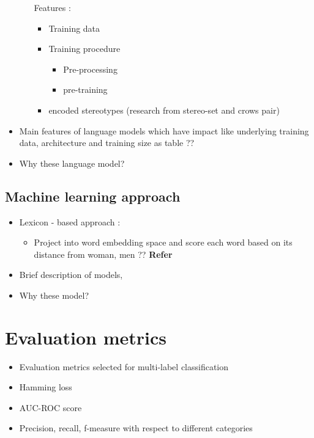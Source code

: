 \begin{itemize}
\begin{itemize}
            Features :
            \begin{itemize}
                \item Training data 
                \item Training procedure
                \begin{itemize}
                    \item Pre-processing
                    \item pre-training
                \end{itemize}
                \item encoded stereotypes (research from stereo-set and crows pair)
            \end{itemize}
    \end{itemize}
    \item Main features of language models which have impact like underlying training data, architecture and training size as table ??
    \item Why these language model?
\end{itemize}
\subsection{Machine learning approach}
    \begin{itemize}
        \item Lexicon - based approach : 
        \begin{itemize}
            \item Project into word embedding space and score each word based on its distance from woman, men ??
            \textbf{Refer }\cite{cryan2020detecting}
        \end{itemize}
        \item Brief description of  models,
        \item Why these model?
    \end{itemize}
\section{Evaluation metrics} \cite{tsoumakas2007multi}
    \begin{itemize}
        \item Evaluation metrics selected for multi-label classification 
        \item Hamming loss 
        \item AUC-ROC score 
        \item Precision, recall, f-measure with respect to different categories
    \end{itemize}
    